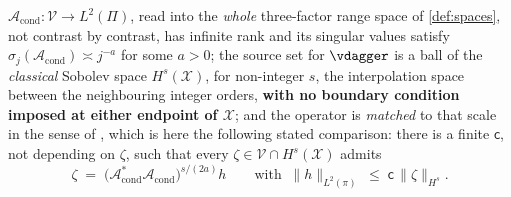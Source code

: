 %
%
%
\begin{assumption}\label{ass:hilbscale}
$\mathcal A_{\mathrm{cond}}:\mathcal V\to L^{2}(\Pi)$, read into the \emph{whole} three-factor range
space of \cref{def:spaces}, not contrast by contrast, has infinite rank and its singular values satisfy
$\sigma_j(\mathcal A_{\mathrm{cond}})\asymp j^{-a}$ for some $a>0$; the source set for $\vdagger$ is a
ball of the \emph{classical} Sobolev space $H^{s}(\mathcal X)$, for non-integer $s$, the interpolation
space between the neighbouring integer orders, \textbf{with no boundary condition imposed at either
endpoint of $\mathcal X$}; and the operator is \emph{matched} to that scale in the sense of
\citet[\S8.5]{engl2000}, which is here the following stated comparison: there is a finite $\mathsf c$,
not depending on $\zeta$, such that every $\zeta\in\mathcal V\cap H^{s}(\mathcal X)$ admits
\begin{equation}\label{eq:h1match}
\zeta\;=\;\big(\mathcal A^{\ast}_{\mathrm{cond}}\mathcal A_{\mathrm{cond}}\big)^{s/(2a)}h
\qquad\text{with }\ \|h\|_{L^{2}(\pi)}\;\le\;\mathsf c\,\|\zeta\|_{H^{s}} .
\end{equation}
\end{assumption}

